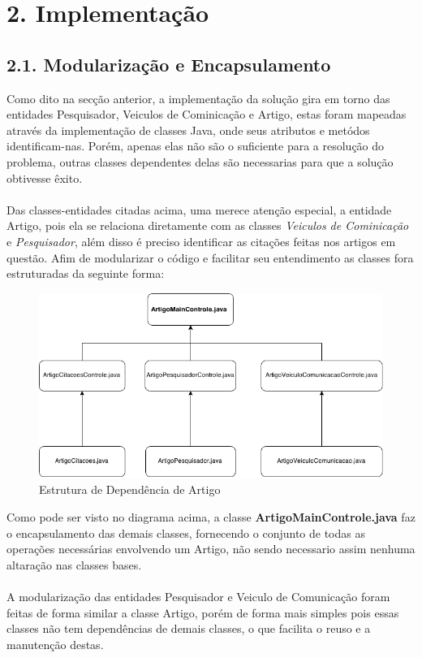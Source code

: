 \documentclass[12pt, a4paper]{article}
\begin{document}
\section*{2. Implementação}
  \subsection*{2.1. Modularização e Encapsulamento}
  Como dito na secção anterior, a implementação da solução gira em torno das entidades Pesquisador, Veiculos de Cominicação e Artigo, estas foram mapeadas através da implementação de classes Java, onde seus atributos e metódos identificam-nas. Porém, apenas elas não são o suficiente para a resolução do problema, outras classes dependentes delas são necessarias para que a solução obtivesse êxito. \\\\
  Das classes-entidades citadas acima, uma merece atenção especial, a entidade Artigo, pois ela se relaciona diretamente com as classes \textit{Veiculos de Cominicação} e \textit{Pesquisador}, além disso é preciso identificar as citações feitas nos artigos em questão. Afim de modularizar o código e facilitar seu entendimento as classes fora estruturadas da seguinte forma:

  \begin{figure}[!htb]
   \centering
    \includegraphics[scale=0.5]{Artigo}
    \caption{Estrutura de Dependência de Artigo}
   \label{Rotulo}
  \end{figure}
  Como pode ser visto no diagrama acima, a classe \textbf{ArtigoMainControle.java} faz o encapsulamento das demais classes, fornecendo o conjunto de todas as operações necessárias envolvendo um Artigo, não sendo necessario assim nenhuma altaração nas classes bases.\\\\
  A modularização das entidades Pesquisador e Veiculo de Comunicação foram feitas de forma similar a classe Artigo, porém de forma mais simples pois essas classes não tem dependências de demais classes, o que facilita o reuso e a manutenção destas.
\end{document}
